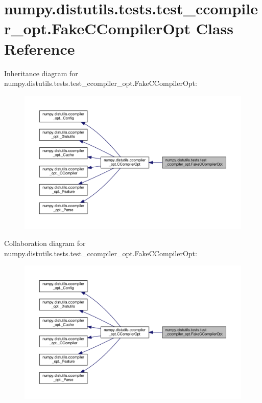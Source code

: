 \hypertarget{classnumpy_1_1distutils_1_1tests_1_1test__ccompiler__opt_1_1FakeCCompilerOpt}{}\section{numpy.\+distutils.\+tests.\+test\+\_\+ccompiler\+\_\+opt.\+Fake\+C\+Compiler\+Opt Class Reference}
\label{classnumpy_1_1distutils_1_1tests_1_1test__ccompiler__opt_1_1FakeCCompilerOpt}


Inheritance diagram for numpy.\+distutils.\+tests.\+test\+\_\+ccompiler\+\_\+opt.\+Fake\+C\+Compiler\+Opt\+:
\nopagebreak
\begin{figure}[H]
\begin{center}
\leavevmode
\includegraphics[width=350pt]{classnumpy_1_1distutils_1_1tests_1_1test__ccompiler__opt_1_1FakeCCompilerOpt__inherit__graph}
\end{center}
\end{figure}


Collaboration diagram for numpy.\+distutils.\+tests.\+test\+\_\+ccompiler\+\_\+opt.\+Fake\+C\+Compiler\+Opt\+:
\nopagebreak
\begin{figure}[H]
\begin{center}
\leavevmode
\includegraphics[width=350pt]{classnumpy_1_1distutils_1_1tests_1_1test__ccompiler__opt_1_1FakeCCompilerOpt__coll__graph}
\end{center}
\end{figure}
